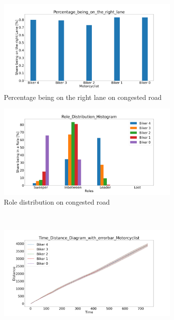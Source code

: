 \begin{figure}[H]
	\centering
	\begin{subfigure}[b]{0.45\textwidth}
		\centering
		\includegraphics[width=1.0\textwidth]{images/Wildschapbachstrase/Wildschapbachstrase_Percentage_being_on_the_right_lane_congested.png}
		\caption{Percentage being on the right lane on congested road}
	\end{subfigure}
	\hfill
	\begin{subfigure}[b]{0.45\textwidth}
		\centering
		\includegraphics[width=1.0\textwidth]{images/Wildschapbachstrase/Wildschapbachstrase_Role_Distribution_Histogram_congested.png}
		\caption{Role distribution on congested road}
	\end{subfigure}
	\\
	\begin{subfigure}[b]{0.45\textwidth}
		\centering
		\includegraphics[width=1.0\textwidth]{images/Wildschapbachstrase/Wildschapbachstrase_Time_Distance_Diagram_with_errorbar_congested.png}

\end{subfigure}
\end{figure}
